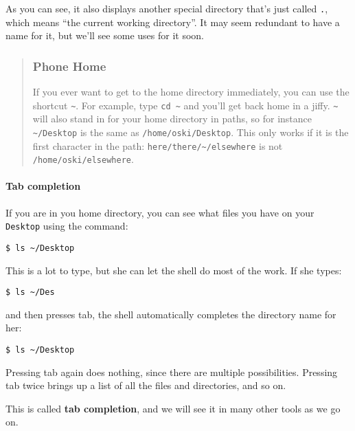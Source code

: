 \documentclass[
]{book}
\begin{document}
As you can see, it also displays another special directory that's just called \texttt{.}, which means ``the current working directory''. It may seem redundant to have a name for it, but we'll see some uses for it soon.

\begin{quote}
\hypertarget{phone-home}{%
\subsubsection{Phone Home}\label{phone-home}}

If you ever want to get to the home directory immediately, you can use the
shortcut \texttt{\textasciitilde{}}. For example, type \texttt{cd\ \textasciitilde{}} and you'll get back home in a jiffy.
\texttt{\textasciitilde{}} will also stand in for your home directory in paths, so for instance
\texttt{\textasciitilde{}/Desktop} is the same as \texttt{/home/oski/Desktop}. This only works if it is
the first character in the path: \texttt{here/there/\textasciitilde{}/elsewhere} is not
\texttt{/home/oski/elsewhere}.
\end{quote}

\hypertarget{tab-completion}{%
\paragraph{Tab completion}\label{tab-completion}}

If you are in you home directory, you can see what files you have on your \texttt{Desktop} using the command:

\begin{verbatim}
$ ls ~/Desktop
\end{verbatim}

This is a lot to type, but she can let the shell do most of the work. If she types:

\begin{verbatim}
$ ls ~/Des
\end{verbatim}

and then presses tab, the shell automatically completes the directory name for her:

\begin{verbatim}
$ ls ~/Desktop
\end{verbatim}

Pressing tab again does nothing, since there are multiple possibilities. Pressing tab twice brings up a list of all the files and directories, and so on.

This is called \textbf{tab completion}, and we will see it in many other tools as we go on.
\end{document}
